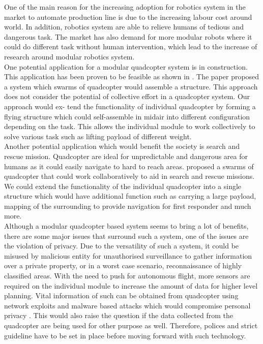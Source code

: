 \documentclass[12pt,A4]{article}
\begin{document}
	One of the main reason for the increasing adoption for robotics system in the market to automate production line is due to the increasing labour cost around world. In addition, robotics system are able to relieve humans of tedious and dangerous task. The market has also demand for more modular robots where it could do different task without human intervention, which lead to the increase of research around modular robotics system.\\
	
	One potential application for a modular quadcopter system is in construction. This application has been proven to be feasible as shown in \citep{augugliaro2014flight}. The paper proposed a system which swarms of
	quadcopter would assemble a structure. This approach does not consider the
	potential of collective effort in a quadcopter system. Our approach would ex-
	tend the functionality of individual quadcopter by forming a flying structure
	which could self-assemble in midair into different configuration depending on
	the task. This allows the individual module to work collectively to solve
	various task such as lifting payload of different weight.\\
	
	Another potential application which would benefit the society is search and rescue mission. Quadcopter are ideal for unpredictable and dangerous area for humans as it could easily navigate to hard to reach areas. \citep{stormont2005autonomous} proposed a swarms of quadcopter that could work collaboratively to aid in search and rescue missions. We could extend the functionality of the individual quadcopter into a single structure which would have additional function such as carrying a large payload, mapping of the surrounding to provide navigation for first responder and much more.\\
	
	Although a modular quadcopter based system seems to bring a lot of benefits, there are some major issues that surround such a system, one of the issues are the violation of privacy. Due to the versatility of such a system, it could be misused by malicious entity for unauthorised surveillance to gather information over a private property, or in a worst case scenario, reconnaissance of highly classified areas. With the need to push for autonomous flight, more sensors are required on the individual module to increase the amount of data for higher
	level planning. Vital information of such can be obtained from quadcopter
	using network exploits and malware based attacks which would compromise
	personal privacy \citep{vattapparamban2016drones}. This would also raise the
	question if the data collected from the quadcopter are being used for other
	purpose as well. Therefore, polices and strict guideline have to be set in place
	before moving forward with such technology.\\
	
\end{document}
